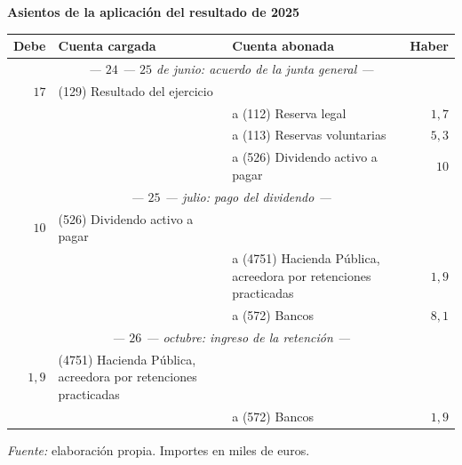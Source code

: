\documentclass[10pt,a4paper]{article}
\begin{document}
\begin{center}\begin{minipage}{\linewidth}\centering
{\small\textbf{Asientos de la aplicación del resultado de 2025}}\par\vspace{0.3em}
{\small
\begin{tabular}{r p{5.6cm} p{6.4cm} r}
\hline
\textbf{Debe} & \textbf{Cuenta cargada} & \textbf{Cuenta abonada} & \textbf{Haber} \\
\hline
\multicolumn{4}{c}{\textit{--- $24$ --- $25$ de junio: acuerdo de la junta general ---}} \\
$17$ & (129) Resultado del ejercicio & & \\
 & & \raggedright a (112) Reserva legal & $1,7$ \\
 & & \raggedright a (113) Reservas voluntarias & $5,3$ \\
 & & \raggedright a (526) Dividendo activo a pagar & $10$ \\
\multicolumn{4}{c}{\textit{--- $25$ --- julio: pago del dividendo ---}} \\
$10$ & (526) Dividendo activo a pagar & & \\
 & & \raggedright a (4751) Hacienda Pública, acreedora por retenciones practicadas & $1,9$ \\
 & & \raggedright a (572) Bancos & $8,1$ \\
\multicolumn{4}{c}{\textit{--- $26$ --- octubre: ingreso de la retención ---}} \\
$1,9$ & \raggedright (4751) Hacienda Pública, acreedora por retenciones practicadas & & \\
 & & \raggedright a (572) Bancos & $1,9$ \\
\hline
\end{tabular}}\par\vspace{0.3em}
{\small\textit{Fuente: }elaboración propia. Importes en miles de euros.}
\end{minipage}\end{center}
\end{document}
